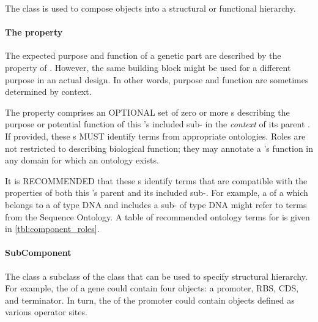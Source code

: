 The  class is used to compose  objects into a structural or functional hierarchy. 

\paragraph{The  property}\label{sec:roles:C}

The expected purpose and function of a genetic part are described by the
 property of . However, the same building block might be used for a different purpose in an actual design. In other words, purpose and function are sometimes determined by context. 

The  property comprises an OPTIONAL set of zero or more  s describing the purpose or potential function of this 's included sub- in the \textit{context} of its parent .
If provided, these  s MUST identify terms from appropriate ontologies. Roles are not restricted to describing biological function; they may annotate a 's function in any domain for which an ontology exists.

It is RECOMMENDED that these  s identify terms that are compatible with the  properties of both this 's parent  and its included sub-. For example, a  of a  which belongs to a  of type DNA and includes a sub- of type DNA might refer to terms from the Sequence Ontology. A table of recommended ontology terms for  is given in \ref{tbl:component_roles}.

\paragraph{SubComponent}
\label{sec:SubComponent}

The  class a subclass of the  class that can be used to specify structural hierarchy. For example, the  of a gene could contain four  objects: a promoter, RBS, CDS, and terminator. In turn, the  of the promoter  could contain  objects defined as various operator sites.

